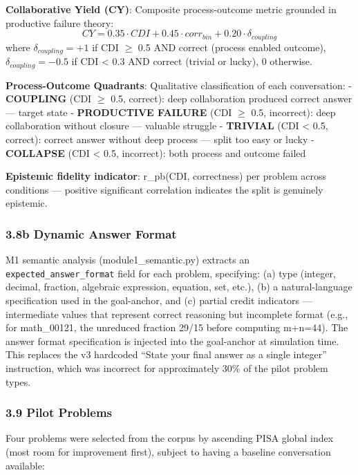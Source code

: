 \documentclass[
  11pt,
]{article}
\begin{document}
\textbf{Collaborative Yield (CY)}: Composite process-outcome metric
grounded in productive failure theory:
\[CY = 0.35 \cdot CDI + 0.45 \cdot corr_{bin} + 0.20 \cdot \delta_{coupling}\]
where \(\delta_{coupling} = +1\) if CDI $\geq$ 0.5 AND correct (process
enabled outcome), \(\delta_{coupling} = -0.5\) if CDI \textless{} 0.3
AND correct (trivial or lucky), 0 otherwise.

\textbf{Process-Outcome Quadrants}: Qualitative classification of each
conversation: - \textbf{COUPLING} (CDI $\geq$ 0.5, correct): deep
collaboration produced correct answer --- target state -
\textbf{PRODUCTIVE FAILURE} (CDI $\geq$ 0.5, incorrect): deep collaboration
without closure --- valuable struggle - \textbf{TRIVIAL} (CDI
\textless{} 0.5, correct): correct answer without deep process --- split
too easy or lucky - \textbf{COLLAPSE} (CDI \textless{} 0.5, incorrect):
both process and outcome failed

\textbf{Epistemic fidelity indicator}: r\_pb(CDI, correctness) per
problem across conditions --- positive significant correlation indicates
the split is genuinely epistemic.

\subsubsection{3.8b Dynamic Answer
Format}\label{b-dynamic-answer-format}

M1 semantic analysis (module1\_semantic.py) extracts an
\texttt{expected\_answer\_format} field for each problem, specifying:
(a) type (integer, decimal, fraction, algebraic expression, equation,
set, etc.), (b) a natural-language specification used in the
goal-anchor, and (c) partial credit indicators --- intermediate values
that represent correct reasoning but incomplete format (e.g., for
math\_00121, the unreduced fraction 29/15 before computing m+n=44). The
answer format specification is injected into the goal-anchor at
simulation time. This replaces the v3 hardcoded ``State your final
answer as a single integer'' instruction, which was incorrect for
approximately 30\% of the pilot problem types.

\subsubsection{3.9 Pilot Problems}\label{pilot-problems}

Four problems were selected from the corpus by ascending PISA global
index (most room for improvement first), subject to having a baseline
conversation available:
\end{document}
